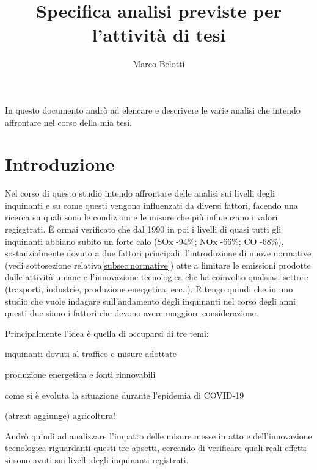 \documentclass{article}
\title{Specifica analisi previste per l'attività di tesi}
\author{Marco Belotti}
\begin{document}
\maketitle
\tableofcontents
\listoftodos
\newpage

In questo documento andrò ad elencare e descrivere le varie analisi che intendo affrontare nel corso della mia tesi. 


\section{Introduzione}
\label{sec:introduzione}
Nel corso di questo studio intendo affrontare delle analisi sui livelli degli inquinanti e su come questi vengono influenzati da diversi fattori, facendo una ricerca su quali sono le condizioni e le misure che più influenzano i valori regisgtrati. È ormai verificato che dal 1990 in poi i livelli di quasi tutti gli inquinanti abbiano subito un forte calo (SOx -94\%; NOx -66\%; CO -68\%)\cite{iir2020}, sostanzialmente dovuto a due fattori principali: l'introduzione di nuove normative (vedi sottosezione relativa\ref{subsec:normative})
atte a limitare le emissioni prodotte dalle attività umane e l'innovazione tecnologica che ha coinvolto qualsiasi settore (trasporti, industrie, produzione energetica, ecc..). Ritengo quindi che in uno studio che vuole indagare sull'andamento degli inquinanti nel corso degli anni questi due siano i fattori che devono avere maggiore considerazione.

Principalmente l'idea è quella di occuparsi di tre temi:
\begin{compactitem}
	\item inquinanti dovuti al traffico e misure adottate
	\item produzione energetica e fonti rinnovabili
	\item come si è evoluta la situazione durante l'epidemia di COVID-19
	\item (atrent aggiunge) agricoltura!
\end{compactitem}

Andrò quindi ad analizzare l'impatto delle misure messe in atto e dell'innovazione tecnologica riguardanti questi tre apsetti, cercando di verificare quali reali effetti si sono avuti sui livelli degli inquinanti registrati.
\end{document}

